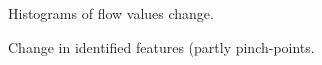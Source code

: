 {%
\begin{figure}[h!]
 \caption{Histograms of flow values change.}
 \label{fig:hist_2}
\end{figure}


\begin{figure}[h!]
 \caption{Change in identified features (partly pinch-points.}
 \label{fig:surf_linear_2}
\end{figure}

}
